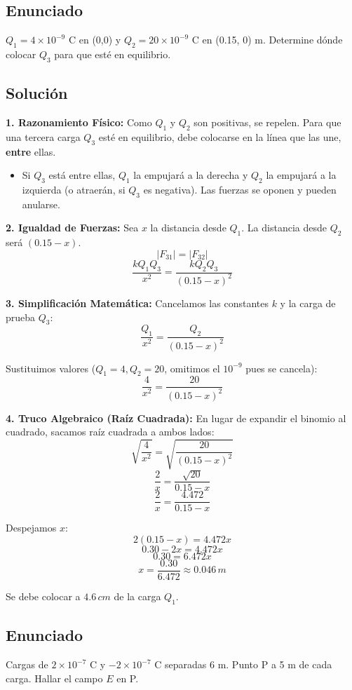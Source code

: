 \documentclass[12pt, a4paper]{article}
\begin{document}
\newpage

\subsection*{Enunciado}
$Q_1 = 4 \times 10^{-9}$ C en (0,0) y $Q_2 = 20 \times 10^{-9}$ C en (0.15, 0) m. Determine dónde colocar $Q_3$ para que esté en equilibrio.

\subsection*{Solución}

\textbf{1. Razonamiento Físico:}
Como $Q_1$ y $Q_2$ son positivas, se repelen. Para que una tercera carga $Q_3$ esté en equilibrio, debe colocarse en la línea que las une, \textbf{entre} ellas.
\begin{itemize}
    \item Si $Q_3$ está entre ellas, $Q_1$ la empujará a la derecha y $Q_2$ la empujará a la izquierda (o atraerán, si $Q_3$ es negativa). Las fuerzas se oponen y pueden anularse.
\end{itemize}

\textbf{2. Igualdad de Fuerzas:}
Sea $x$ la distancia desde $Q_1$. La distancia desde $Q_2$ será $(0.15 - x)$.
$$ |F_{31}| = |F_{32}| $$
$$ \frac{k Q_1 Q_3}{x^2} = \frac{k Q_2 Q_3}{(0.15 - x)^2} $$

\textbf{3. Simplificación Matemática:}
Cancelamos las constantes $k$ y la carga de prueba $Q_3$:
$$ \frac{Q_1}{x^2} = \frac{Q_2}{(0.15 - x)^2} $$

Sustituimos valores ($Q_1=4, Q_2=20$, omitimos el $10^{-9}$ pues se cancela):
$$ \frac{4}{x^2} = \frac{20}{(0.15 - x)^2} $$

\textbf{4. Truco Algebraico (Raíz Cuadrada):}
En lugar de expandir el binomio al cuadrado, sacamos raíz cuadrada a ambos lados:
$$ \sqrt{\frac{4}{x^2}} = \sqrt{\frac{20}{(0.15 - x)^2}} $$
$$ \frac{2}{x} = \frac{\sqrt{20}}{0.15 - x} $$
$$ \frac{2}{x} = \frac{4.472}{0.15 - x} $$

Despejamos $x$:
$$ 2(0.15 - x) = 4.472 x $$
$$ 0.30 - 2x = 4.472 x $$
$$ 0.30 = 6.472 x $$
$$ x = \frac{0.30}{6.472} \approx 0.046 \, \si{m} $$

\begin{tcolorbox}[colback=green!5!white,title=Respuesta]
Se debe colocar a $4.6 \, \si{cm}$ de la carga $Q_1$.
\end{tcolorbox}

\newpage

\subsection*{Enunciado}
Cargas de $2 \times 10^{-7}$ C y $-2 \times 10^{-7}$ C separadas 6 m. Punto P a 5 m de cada carga. Hallar el campo $E$ en P.
\end{document}
